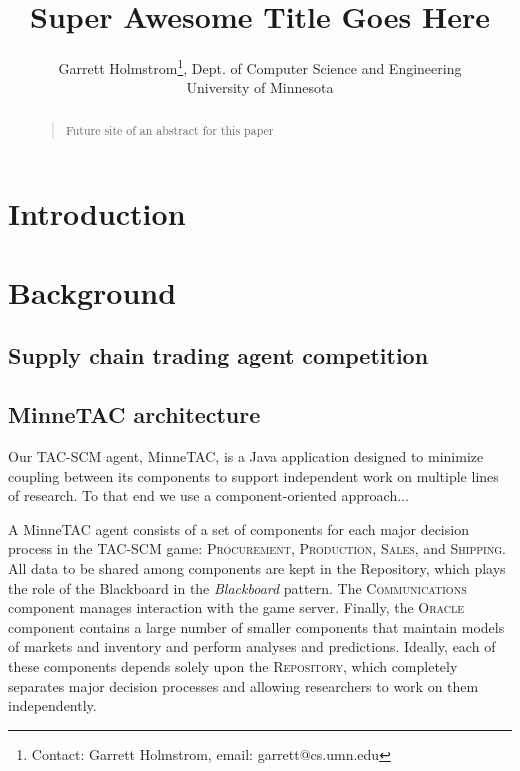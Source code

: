 \documentclass{article}
\begin{document}
\title{Super Awesome Title Goes Here}

\author{Garrett Holmstrom\thanks{Contact: Garrett Holmstrom, email: garrett@cs.umn.edu},
    Dept. of Computer Science and Engineering \\ University of Minnesota
}

\date{}

\maketitle

\begin{abstract}
\begin{quote}
Future site of an abstract for this paper
\end{quote}
\end{abstract}

\section{Introduction}

\section{Background}

\subsection{Supply chain trading agent competition}

\subsection{MinneTAC architecture}

Our TAC-SCM agent, MinneTAC, is a Java application designed to minimize
coupling between its components to support independent work on multiple
lines of research.  To that end we use a component-oriented approach...

A MinneTAC agent consists of a set of components for each major decision
process in the TAC-SCM game: \textsc{Procurement}, \textsc{Production},
\textsc{Sales}, and \textsc{Shipping}.  All data to be shared
among components are kept in the Repository, which plays the role
of the Blackboard in the \emph{Blackboard} pattern\cite{Busch96}.
The \textsc{Communications} component manages interaction with the game
server.  Finally, the \textsc{Oracle} component contains a large number
of smaller components that maintain models of markets and inventory and
perform analyses and predictions.  Ideally, each of these components
depends solely upon the \textsc{Repository}, which completely separates
major decision processes and allowing researchers to work on them
independently.
\end{document}
